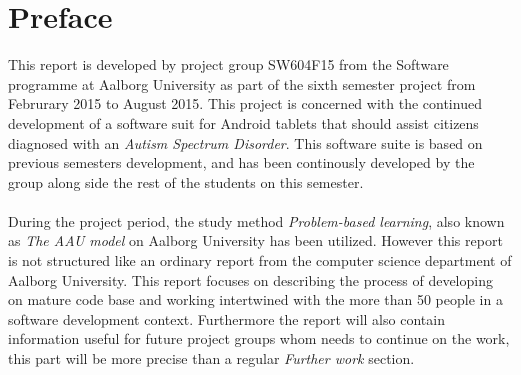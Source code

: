 
\chapter*{Preface}

This report is developed by project group SW604F15 from the Software programme at Aalborg University as part of the sixth semester project from Februrary 2015 to August 2015. This project is concerned with the continued development of a software suit for Android tablets that should assist citizens diagnosed with an \emph{Autism Spectrum Disorder}. This software suite is based on previous semesters development, and has been continously developed by the group along side the rest of the students on this semester.
\\\\
During the project period, the study method \emph{Problem-based learning}, also known as \emph{The AAU model} on Aalborg University has been utilized. However this report is not structured like an ordinary report from the computer science department of Aalborg University. This report focuses on describing the process of developing on mature code base and working intertwined with the more than 50 people in a software development context. Furthermore the report will also contain information useful for future project groups whom needs to continue on the work, this part will be more precise than a regular \emph{Further work} section.

